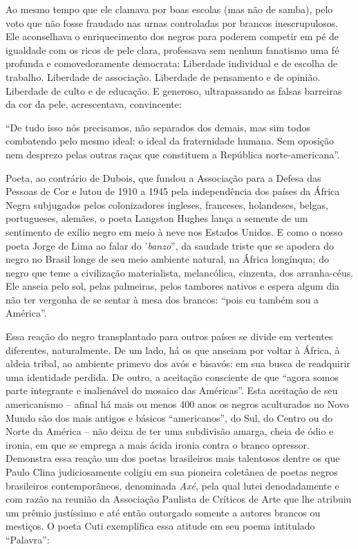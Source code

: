 \documentclass[
  letterpaper,
  DIV=11,
  numbers=noendperiod]{scrreprt}
\begin{document}
Ao mesmo tempo que ele clamava por boas escolas (mas não de samba), pelo
voto que não fosse fraudado nas urnas controladas por brancos
inescrupulosos. Ele aconselhava o enriquecimento dos negros para poderem
competir em pé de igualdade com os ricos de pele clara, professava sem
nenhum fanatismo uma fé profunda e comovedoramente democrata: Liberdade
individual e de escolha de trabalho. Liberdade de associação. Liberdade
de pensamento e de opinião. Liberdade de culto e de educação. E
generoso, ultrapassando as falsas barreiras da cor da pele,
acrescentava, convincente:

``De tudo isso nós precisamos, não separados dos demais, mas sim todos
combatendo pelo mesmo ideal: o ideal da fraternidade humana. Sem
oposição nem desprezo pelas outras raças que constituem a República
norte-americana''.

Poeta, ao contrário de Dubois, que fundou a Associação para a Defesa das
Pessoas de Cor e lutou de 1910 a 1945 pela independência dos países da
África Negra subjugados pelos colonizadores ingleses, franceses,
holandeses, belgas, portugueses, alemães, o poeta Langston Hughes lança
a semente de um sentimento de exílio negro em meio à neve nos Estados
Unidos. E como o nosso poeta Jorge de Lima ao falar do '\emph{banzo}'',
da saudade triste que se apodera do negro no Brasil longe de seu meio
ambiente natural, na África longínqua; do negro que teme a civilização
materialista, melancólica, cinzenta, dos arranha-céus. Ele anseia pelo
sol, pelas palmeiras, pelos tambores nativos e espera algum dia não ter
vergonha de se sentar à mesa dos brancos: ``pois eu também sou a
América''.

Essa reação do negro transplantado para outros países se divide em
vertentes diferentes, naturalmente. De um lado, há os que anseiam por
voltar à África, à aldeia tribal, ao ambiente primevo dos avós e
bisavós: em sua busca de readquirir uma identidade perdida. De outro, a
aceitação consciente de que ``agora somos parte integrante e inalienável
do mosaico das Américas''. Esta aceitação de seu americanismo -- afinal
há mais ou menos 400 anos os negros aculturados no Novo Mundo são dos
mais antigos e básicos ``americanos'', do Sul, do Centro ou do Norte da
América -- não deixa de ter uma subdivisão amarga, cheia de ódio e
ironia, em que se emprega a mais ácida ironia contra o branco opressor.
Demonstra essa reação um dos poetas brasileiros mais talentosos dentre
os que Paulo Clina judiciosamente coligiu em sua pioneira coletânea de
poetas negros brasileiros contemporâneos, denominada \emph{Axé}, pela
qual lutei denodadamente e com razão na reunião da Associação Paulista
de Críticos de Arte que lhe atribuiu um prêmio justíssimo e até então
outorgado somente a autores brancos ou mestiços. O poeta Cuti
exemplifica essa atitude em seu poema intitulado ``Palavra'':
\end{document}
